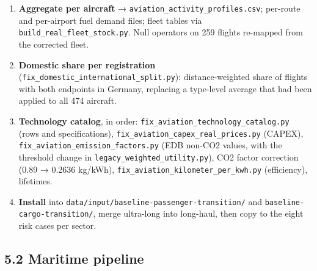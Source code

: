 \documentclass[11pt,a4paper]{article}
\begin{document}
\begin{enumerate}
\item{} \textbf{Aggregate per aircraft} → \texttt{aviation\_\allowbreak{}activity\_\allowbreak{}profiles.\allowbreak{}csv}; per-route and per-airport fuel demand files; fleet tables via \texttt{build\_\allowbreak{}real\_\allowbreak{}fleet\_\allowbreak{}stock.\allowbreak{}py}. Null operators on 259 flights re-mapped from the corrected fleet.
\item{} \textbf{Domestic share per registration} (\texttt{fix\_\allowbreak{}domestic\_\allowbreak{}international\_\allowbreak{}split.\allowbreak{}py}): distance-weighted share of flights with both endpoints in Germany, replacing a type-level average that had been applied to all 474 aircraft.
\item{} \textbf{Technology catalog}, in order: \texttt{fix\_\allowbreak{}aviation\_\allowbreak{}technology\_\allowbreak{}catalog.\allowbreak{}py} (rows and specifications), \texttt{fix\_\allowbreak{}aviation\_\allowbreak{}capex\_\allowbreak{}real\_\allowbreak{}prices.\allowbreak{}py} (CAPEX), \texttt{fix\_\allowbreak{}aviation\_\allowbreak{}emission\_\allowbreak{}factors.\allowbreak{}py} (EDB non-CO2 values, with the threshold change in \texttt{legacy\_\allowbreak{}weighted\_\allowbreak{}utility.\allowbreak{}py}), CO2 factor correction (0.89 → 0.2636 kg/kWh), \texttt{fix\_\allowbreak{}aviation\_\allowbreak{}kilometer\_\allowbreak{}per\_\allowbreak{}kwh.\allowbreak{}py} (efficiency), lifetimes.
\item{} \textbf{Install} into \texttt{data/\allowbreak{}input/\allowbreak{}baseline-passenger-transition/\allowbreak{}} and \texttt{baseline-cargo-transition/\allowbreak{}}, merge ultra-long into long-haul, then copy to the eight risk cases per sector.
\end{enumerate}

\subsection*{5.2 Maritime pipeline}
\end{document}
